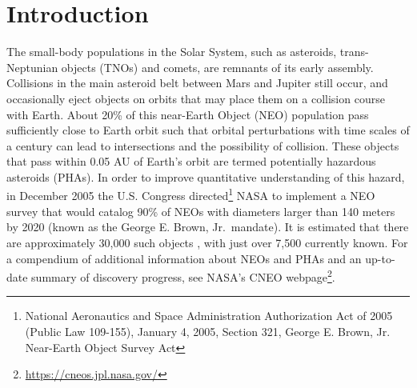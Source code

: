 
\section{Introduction}

The small-body populations in the Solar System, such as asteroids, trans-Neptunian objects (TNOs)
and comets, are remnants of its early assembly. Collisions in the main asteroid belt between Mars and
Jupiter still occur, and occasionally eject objects on orbits that may place them on a collision course
with Earth. About 20\% of this near-Earth Object (NEO) population pass sufficiently close to Earth orbit such that
orbital perturbations with time scales of a century can lead to intersections and the possibility of collision. These objects that pass within 0.05 AU of Earth's orbit are termed potentially hazardous asteroids (PHAs).
In order to improve quantitative understanding of this hazard, in December 2005 the U.S. Congress
directed\footnote{National Aeronautics and Space Administration Authorization Act of 2005 (Public Law 109-155), January 4, 2005, Section 321, George E. Brown, Jr. Near-Earth Object Survey Act} NASA to implement a NEO survey that
would catalog 90\% of NEOs with diameters larger than 140 meters by 2020 (known as the George
E. Brown, Jr.\ mandate). It is estimated that there are approximately 30,000 such objects 
\citep{harris15, 2012ApJ...752..110M, 2016Natur.530..303G, 2017Icar..284..114S}, with just over 7,500 currently known.
For a compendium of additional information about NEOs and PHAs and an up-to-date summary of
discovery progress, see NASA's CNEO webpage\footnote{\url{https://cneos.jpl.nasa.gov/}}.

